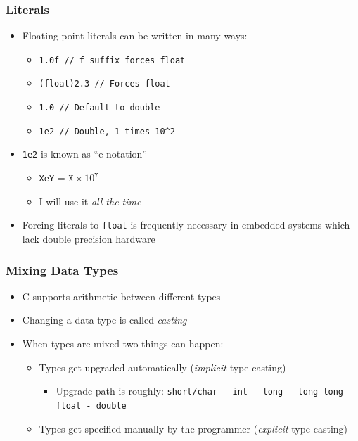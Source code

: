 \documentclass[14pt]{beamer}
\begin{document}
\begin{frame}
\frametitle{Literals}
\begin{itemize}
\item Floating point literals can be written in many ways:
	\begin{itemize}
		\item \texttt{1.0f // f suffix forces float}
		\item \texttt{(float)2.3 // Forces float}
		\item \texttt{1.0 // Default to double}
		\item \texttt{1e2 // Double, 1 times 10\^{}2}
	\end{itemize}
\item \texttt{1e2} is known as ``e-notation''
	\begin{itemize}
		\item \texttt{XeY} = $\texttt{X} \times 10^\texttt{Y}$
		\item I will use it \textit{all the time}
	\end{itemize}
\item Forcing literals to \texttt{float} is frequently necessary in embedded systems which lack double precision hardware
\end{itemize}
\end{frame}

\begin{frame}
\frametitle{Mixing Data Types}
\begin{itemize}
\item C supports arithmetic between different types
\item Changing a data type is called \textit{casting}
\item When types are mixed two things can happen:
	\begin{itemize}
		\item Types get upgraded automatically (\textit{implicit} type casting)
			\begin{itemize}
				\item Upgrade path is roughly: \texttt{short/char - int - long - long long - float - double}
			\end{itemize}
		\item Types get specified manually by the programmer (\textit{explicit} type casting)
	\end{itemize}
\end{itemize}
\end{frame}
\end{document}
